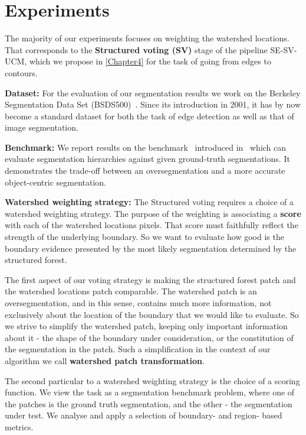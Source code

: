 \chapter{Experiments}
\label{Chapter5}
The majority of our experiments focuses on weighting the watershed locations. That corresponds to the \textbf{Structured voting (SV)} stage of the pipeline SE-SV-UCM, which we propose in \cref{Chapter4} for the task of going from edges to contours.

\textbf{Dataset:} For the evaluation of our segmentation results we work on the Berkeley Segmentation Data Set (BSDS500)~\cite{Arbelaez11}. Since its introduction in 2001, it has by now become a standard dataset for both the task of edge detection as well as that of image segmentation.

\textbf{Benchmark:} We report results on the benchmark~\cite{Galasso13Benchmark} introduced in~\cite{Galasso13} which can evaluate segmentation hierarchies against given ground-truth segmentations. It demonstrates the trade-off between an oversegmentation and a more accurate object-centric segmentation.

\textbf{Watershed weighting strategy:} The Structured voting requires a choice of a watershed weighting strategy. The purpose of the weighting is associating a \textbf{score} with each of the watershed locations pixels. That score must faithfully reflect the strength of the underlying boundary. So we want to evaluate how good is the boundary evidence presented by the most likely segmentation determined by the structured forest. 

The first aspect of our voting strategy is making the structured forest patch and the watershed locations patch comparable. The watershed patch is an oversegmentation, and in this sense, contains much more information, not exclusively about the location of the boundary that we would like to evaluate. So we strive to simplify the watershed patch, keeping only important information about it - the shape of the boundary under consideration, or the constitution of the segmentation in the patch. Such a simplification in the context of our algorithm we call {\bf watershed patch transformation}. %

The second particular to a watershed weighting strategy is the choice of a scoring function. We view the task as a segmentation benchmark problem, where one of the patches is the ground truth segmentation, and the other - the segmentation under test. We analyse and apply a selection of boundary- and region- based metrics.

